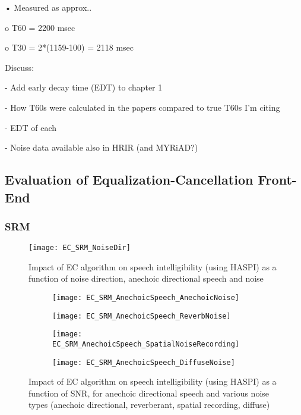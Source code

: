 •	Measured as approx..

o	T60 = 2200 msec

o	T30 = 2*(1159-100) = 2118 msec


Discuss:

- Add early decay time (EDT) to  chapter 1

- How T60s were calculated in the papers compared to true T60s I'm citing

- EDT of each

- Noise data available also in HRIR (and MYRiAD?)

\subsection{Evaluation of Equalization-Cancellation Front-End}

\subsubsection{SRM}

\begin{figure}[H]
	\texttt{[image: EC\_SRM\_NoiseDir]}
	\centering
	\caption{Impact of EC algorithm on speech intelligibility (using HASPI) as a function of noise direction, anechoic directional speech and noise}
	\label{fig:EC_SRM_NoiseDir}
\end{figure}

\begin{figure}[H]
	\centering
	\begin{subfigure}[b]{0.49\textwidth}
		\centering
		\texttt{[image: EC\_SRM\_AnechoicSpeech\_AnechoicNoise]}
	\end{subfigure}
	\hfill
	\begin{subfigure}[b]{0.49\textwidth}
		\centering
		\texttt{[image: EC\_SRM\_AnechoicSpeech\_ReverbNoise]}
	\end{subfigure}
	\hfill
	\begin{subfigure}[b]{0.49\textwidth}
		\centering
		\texttt{[image: EC\_SRM\_AnechoicSpeech\_SpatialNoiseRecording]}
	\end{subfigure}
	\hfill
	\begin{subfigure}[b]{0.49\textwidth}
		\centering
		\texttt{[image: EC\_SRM\_AnechoicSpeech\_DiffuseNoise]}
	\end{subfigure}
	\hfill
	\caption{Impact of EC algorithm on speech intelligibility (using HASPI) as a function of SNR, for anechoic directional speech and various noise types (anechoic directional, reverberant, spatial recording, diffuse)}
	\label{fig:EC_SRM_AnechoicSpeech}
\end{figure}


